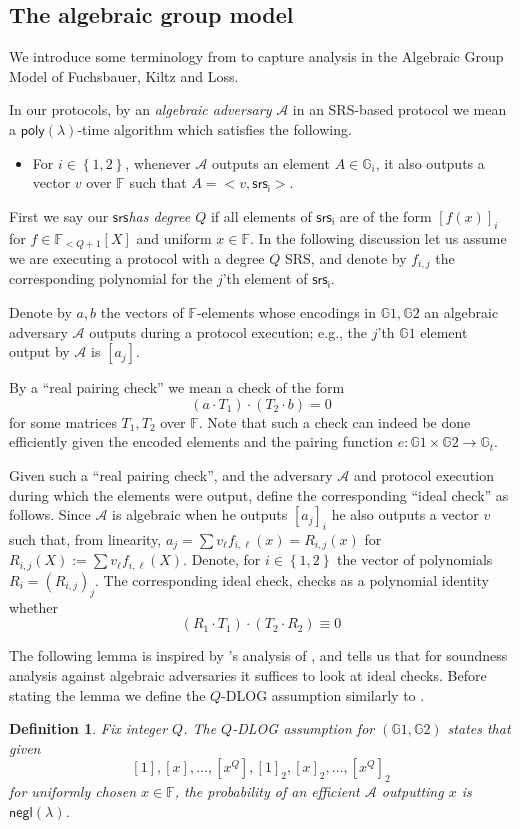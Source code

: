 \documentclass[11pt]{article} %
\newcommand{\Gi}{\ensuremath{{\mathbb G}_i}\xspace}
\newcommand{\G}{\ensuremath{{\mathbb G}}\xspace}
\newcommand{\Gt}{\ensuremath{{\mathbb G}_t}\xspace}
\newcommand{\F}{\ensuremath{\mathbb F}\xspace}
\newcommand{\adv}{\ensuremath{\mathcal A}\xspace}
\newcommand{\srs}{\ensuremath{\mathsf{srs}}\xspace}
\newcommand{\srsi}{\ensuremath{\mathsf{srs_i}}\xspace}
\newcommand{\negl}{\ensuremath{\mathsf{negl}(\lambda)}\xspace}
\newcommand{\defeq}{:=}
\newcommand{\enci}[1]{\ensuremath{\left[#1\right]_i}\xspace}
\newcommand{\enc}[1]{\ensuremath{\left[#1\right]}\xspace}
\newcommand{\enctwo}[1]{\ensuremath{\left[#1\right]_2}\xspace}
\newcommand{\set}[1]{\ensuremath{\left\{#1\right\}}\xspace}
\newcommand{\polysofdeg}[1]{\ensuremath{\F_{< #1}[X]}\xspace}
\newtheorem{dfn}[lemma]{Definition}
\newcommand{\poly}{\ensuremath{\mathsf{poly(\lambda)}}\xspace}
\begin{document}
\subsection{The algebraic group model}\label{subsec:agm}
We introduce some terminology from \cite{plonk} to capture analysis in the Algebraic Group Model of Fuchsbauer, Kiltz and Loss\cite{AGM}.

In our protocols, by an \emph{algebraic adversary} \adv in an SRS-based protocol we mean a \poly-time algorithm which satisfies the following.
\begin{itemize}
 \item For $i\in \set{1,2}$, whenever \adv outputs an element $A\in \Gi$, it also outputs a vector $v$ over \F such that $A = <v,\srsi>$.
\end{itemize}

First we say our \srs \emph{has degree $Q$} if all elements of \srsi are of the form  \enci{f(x)} for $f\in \polysofdeg{Q+1}$ and uniform $x\in \F$. In the following discussion let us assume we are executing a protocol with a degree $Q$ SRS, and denote by $f_{i,j}$ the corresponding polynomial for the $j$'th element of \srsi.

Denote by $a,b$ the vectors of $\F$-elements whose encodings in $\G1,\G2$ an algebraic adversary \adv outputs during a protocol execution; e.g., the $j$'th $\G1$ element output by \adv is \enc{a_j}.

By a ``real pairing check'' we mean a check of the form
\[(a\cdot T_1) \cdot (T_2\cdot b)=0\]
for some matrices $T_1,T_2$ over $\F$.
Note that such a check can indeed be done efficiently given the encoded elements and the pairing function $e:\G1\times \G2\to \Gt$.



Given such a ``real pairing check'', and the adversary \adv and protocol execution during which the elements were output, define the corresponding ``ideal check'' as follows.
Since \adv is algebraic when he outputs \enci{a_j} he also outputs a vector $v$ such that, from linearity, $a_j = \sum v_\ell f_{i,\ell}(x)=R_{i,j}(x)$ for $R_{i,j}(X) \defeq \sum v_\ell f_{i,\ell}(X)$.
Denote, for $i\in \set{1,2}$ the vector of polynomials $R_i=(R_{i,j})_j$.
The corresponding ideal check, checks as a polynomial identity whether
\[(R_1 \cdot T_1)\cdot (T_2\cdot R_2) \equiv 0\]


The following lemma is inspired by \cite{AGM}'s analysis of \cite{Groth16},
and tells us that for soundness analysis against algebraic adversaries it suffices to look at ideal checks.
Before stating the lemma we define the $Q$-DLOG assumption similarly to \cite{AGM}.
\begin{dfn}\label{ref:qdlog}
 Fix integer $Q$. The \emph{$Q$-DLOG assumption for $(\G1,\G2)$} states that given 
 \[\enc{1},\enc{x},\ldots,\enc{x^Q},\enctwo{1},\enctwo{x},\ldots,\enctwo{x^Q}\]
 for uniformly chosen $x\in \F$, the probability of an efficient \adv outputting $x$
 is \negl.
\end{dfn}
\end{document}
